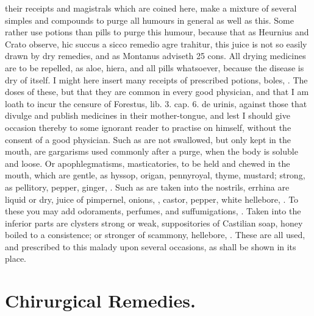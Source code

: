 {their receipts and magistrals which are coined here, make a mixture of
several simples and compounds to purge all humours in general as well
as this. Some rather use potions than pills to purge this humour,
because that as Heurnius and Crato observe, hic succus a sicco remedio
agre trahitur, this juice is not so easily drawn by dry remedies, and
as Montanus adviseth 25 cons. All drying medicines are to be
repelled, as aloe, hiera, and all pills whatsoever, because the disease
is dry of itself.
I might here insert many receipts of prescribed potions, boles, \etc{}. The
doses of these, but that they are common in every good physician, and
that I am loath to incur the censure of Forestus, lib. 3. cap. 6. de
urinis, against those that divulge and publish medicines in their
mother-tongue, and lest I should give occasion thereby to some ignorant
reader to practise on himself, without the consent of a good physician.
Such as are not swallowed, but only kept in the mouth, are gargarisms
used commonly after a purge, when the body is soluble and loose. Or
apophlegmatisms, masticatories, to be held and chewed in the mouth,
which are gentle, as hyssop, origan, pennyroyal, thyme, mustard;
strong, as pellitory, pepper, ginger, \etc{}.
Such as are taken into the nostrils, errhina are liquid or dry, juice
of pimpernel, onions, \etc{}, castor, pepper, white hellebore, \etc{}. To
these you may add odoraments, perfumes, and suffumigations, \etc{}.
Taken into the inferior parts are clysters strong or weak,
suppositories of Castilian soap, honey boiled to a consistence; or
stronger of scammony, hellebore, \etc{}.
These are all used, and prescribed to this malady upon several
occasions, as shall be shown in its place.


\section{Chirurgical Remedies.}

}
